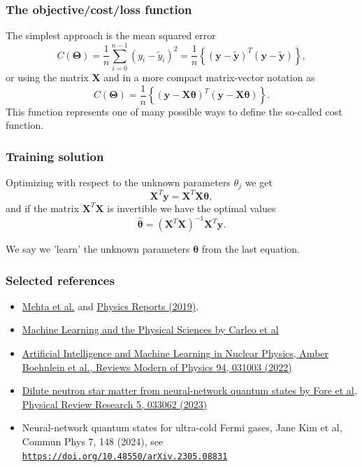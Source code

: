 \documentclass{beamer}
\begin{document}
\begin{frame}
\frametitle{The objective/cost/loss function}

The  simplest approach is the mean squared error
\[
C(\bm{\Theta})=\frac{1}{n}\sum_{i=0}^{n-1}\left(y_i-\tilde{y}_i\right)^2=\frac{1}{n}\left\{\left(\bm{y}-\bm{\tilde{y}}\right)^T\left(\bm{y}-\bm{\tilde{y}}\right)\right\},
\]
or using the matrix $\bm{X}$ and in a more compact matrix-vector notation as
\[
C(\bm{\Theta})=\frac{1}{n}\left\{\left(\bm{y}-\bm{X}\bm{\theta}\right)^T\left(\bm{y}-\bm{X}\bm{\theta}\right)\right\}.
\]
This function represents one of many possible ways to define the so-called cost function.
\end{frame}

\begin{frame}
\frametitle{Training solution}

Optimizing with respect to the unknown parameters $\theta_j$ we get 
\[
\bm{X}^T\bm{y} = \bm{X}^T\bm{X}\bm{\theta},  
\]
and if the matrix $\bm{X}^T\bm{X}$ is invertible we have the optimal values
\[
\hat{\bm{\theta}} =\left(\bm{X}^T\bm{X}\right)^{-1}\bm{X}^T\bm{y}.
\]

We say we 'learn' the unknown parameters $\bm{\theta}$ from the last equation.
\end{frame}

\begin{frame}
\frametitle{Selected references}

\begin{block}{}
\begin{itemize}
\item \href{{https://arxiv.org/abs/1803.08823}}{Mehta et al.} and \href{{https://www.sciencedirect.com/science/article/pii/S0370157319300766?via%3Dihub}}{Physics Reports (2019)}.

\item \href{{https://link.aps.org/doi/10.1103/RevModPhys.91.045002}}{Machine Learning and the Physical Sciences by Carleo et al}

\item \href{{https://journals.aps.org/rmp/abstract/10.1103/RevModPhys.94.031003}}{Artificial Intelligence and Machine Learning in Nuclear Physics, Amber Boehnlein et al., Reviews Modern of Physics 94, 031003 (2022)} 

\item \href{{https://journals.aps.org/prresearch/pdf/10.1103/PhysRevResearch.5.033062}}{Dilute neutron star matter from neural-network quantum states by Fore et al, Physical Review Research 5, 033062 (2023)}

\item Neural-network quantum states for ultra-cold Fermi gases, Jane Kim et al, Commun Phys 7, 148 (2024), see \href{{https://doi.org/10.48550/arXiv.2305.08831}}{\nolinkurl{https://doi.org/10.48550/arXiv.2305.08831}}
\end{itemize}

\noindent
\end{block}
\end{frame}
\end{document}

